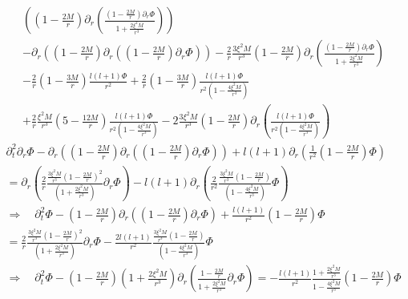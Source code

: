 \documentclass[12pt]{article}
\def\nn{\nonumber}
\begin{document}
\begin{gather}
\left(
(1 - \frac{2 M}{r})
\partial_{r}
\left(
\frac{(1 - \frac{2 M}{r}) \partial_{r} \Phi}{1 + \frac{2 \xi^{2} M}{r^{3}}}
\right)
\right)
\nn \\
-
\partial_{r}
\left(
(1 - \frac{2 M}{r})
\partial_{r}
\left(
(1 - \frac{2 M}{r}) \partial_{r} \Phi
\right)
\right)
-
\frac{2}{r}
\frac{3 \xi^{2} M}{r^{3}} (1 - \frac{2 M}{r})
\partial_{r} 
\left(
\frac{(1 - \frac{2 M}{r}) \partial_{r} \Phi}{1 + \frac{2 \xi^{2} M}{r^{3}}}
\right)
\nn \\
-
\frac{2}{r}
(1 - \frac{3 M}{r})
\frac{l (l +1) \Phi}{r^{2}}
+
\frac{2}{r}
(1 - \frac{3 M}{r})
\frac{l (l +1) \Phi}{r^{2} (1 - \frac{4 \xi^{2} M}{r^{3}})}
\nn \\
+
\frac{2}{r}
\frac{\xi^{2} M}{r^{3}} (5 - \frac{12 M}{r})
\frac{l (l +1) \Phi}{r^{2} (1 - \frac{4 \xi^{2} M}{r^{3}})}
-
2
\frac{3 \xi^{2} M}{r^{3}} (1 - \frac{2 M}{r})
\partial_{r}
\left(
\frac{l (l +1) \Phi}{r^{2} (1 - \frac{4 \xi^{2} M}{r^{3}})}
\right)
\end{gather}
\begin{gather}
\partial^{2}_{t} \partial_{r} \Phi
-
\partial_{r}
\left(
(1 - \frac{2 M}{r})
\partial_{r}
\left(
(1 - \frac{2 M}{r}) \partial_{r} \Phi
\right)
\right)
+
l (l + 1)
\partial_{r} \left( \frac{1}{r^{2}} (1 - \frac{2 M}{r}) \Phi\right)
\nn \\
=
\partial_{r}
\left(
\frac{2}{r}
\frac{\frac{3 \xi^{2} M}{r^{3}} (1 - \frac{2 M}{r})^{2}}{(1 + \frac{2 \xi^{2} M}{r^{3}})}
\partial_{r} \Phi
\right)
-
l ( l + 1)
\partial_{r}
\left(
\frac{2}{r^{2}}
\frac{\frac{3 \xi^{2} M}{r^{3}} (1 - \frac{2 M}{r})}{(1 -\frac{4 \xi^{2} M}{r^{3}})}
\Phi
\right)
\nn \\
\Rightarrow
\quad
\partial^{2}_{t} \Phi
-
(1 - \frac{2 M}{r})
\partial_{r}
\left(
(1 - \frac{2 M}{r}) \partial_{r} \Phi
\right)
+
\frac{l (l + 1)}{r^{2}} (1 - \frac{2 M}{r}) \Phi
\nn \\
=
\frac{2}{r}
\frac{\frac{3 \xi^{2} M}{r^{3}} (1 - \frac{2 M}{r})^{2}}{(1 + \frac{2 \xi^{2} M}{r^{3}})}
\partial_{r} \Phi
-
\frac{2 l ( l + 1)}{r^{2}}
\frac{\frac{3 \xi^{2} M}{r^{3}} (1 - \frac{2 M}{r})}{(1 -\frac{4 \xi^{2} M}{r^{3}})}
\Phi
\nn \\
\Rightarrow
\quad
\partial^{2}_{t} \Phi
-
(1 - \frac{2 M}{r})
(1 + \frac{2 \xi^{2} M}{r^{3}})
\partial_{r}
\left(
\frac{1 - \frac{2 M}{r}}{1 + \frac{2 \xi^{2} M}{r^{3}}} \partial_{r} \Phi
\right)
=
-
\frac{l ( l + 1)}{r^{2}}
\frac{1 + \frac{2 \xi^{2} M}{r^{3}}}{1 -\frac{4 \xi^{2} M}{r^{3}}}
 (1 - \frac{2 M}{r})
\Phi
\end{gather}
\end{document}
